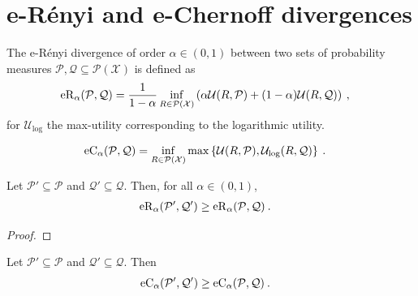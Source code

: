 \chapter{e-Rényi and e-Chernoff divergences}

\begin{definition}\label{def:erenyiDiv}
  \leanok
The e-Rényi divergence of order $\alpha \in (0,1)$ between two sets of probability measures $\mathcal{P}, \mathcal{Q} \subseteq \mathcal{P}(\mathcal{X})$ is defined as
\begin{align*}
  \operatorname{eR}_\alpha(\mathcal{P}, \mathcal{Q})
  &= \frac{1}{1 - \alpha} \inf_{R \in \mathcal{P}(\mathcal{X})} \left( \alpha \mathcal{U}(R, \mathcal{P}) + (1 - \alpha) \mathcal{U}(R, \mathcal{Q}) \right)
  \: ,
\end{align*}
for $\mathcal{U}_{\log}$ the max-utility corresponding to the logarithmic utility.
\end{definition}


\begin{definition}\label{def:echernoffDiv}
  \leanok
\begin{align*}
  \operatorname{eC}_\alpha(\mathcal{P}, \mathcal{Q})
  &= \inf_{R \in \mathcal{P}(\mathcal{X})} \max\left\{\mathcal{U}(R, \mathcal{P}), \mathcal{U}_{\log}(R, \mathcal{Q}) \right\}
  \: .
\end{align*}
\end{definition}


\begin{lemma}\label{lem:erenyiDiv_anti}
  \leanok
Let $\mathcal{P}' \subseteq \mathcal{P}$ and $\mathcal{Q}' \subseteq \mathcal{Q}$.
Then, for all $\alpha \in (0, 1)$,
\begin{align*}
  \operatorname{eR}_\alpha(\mathcal{P}', \mathcal{Q}')
  &\ge \operatorname{eR}_\alpha(\mathcal{P}, \mathcal{Q})
  \: .
\end{align*}
\end{lemma}

\begin{proof}\leanok

\end{proof}


\begin{lemma}\label{lem:echernoffDiv_anti}
  \leanok
Let $\mathcal{P}' \subseteq \mathcal{P}$ and $\mathcal{Q}' \subseteq \mathcal{Q}$.
Then
\begin{align*}
  \operatorname{eC}_\alpha(\mathcal{P}', \mathcal{Q}')
  &\ge \operatorname{eC}_\alpha(\mathcal{P}, \mathcal{Q})
  \: .
\end{align*}
\end{lemma}

